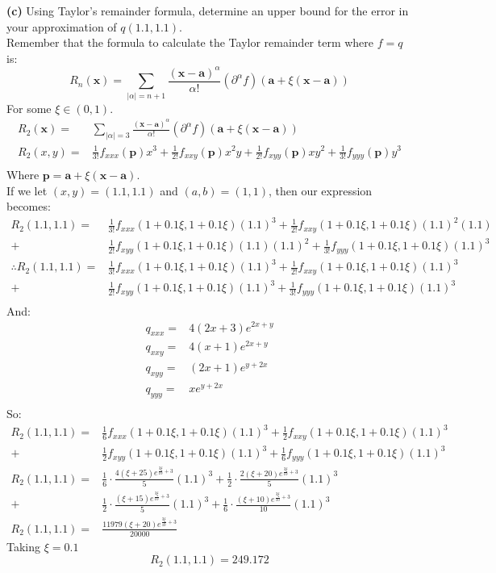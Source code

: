 \documentclass[12pt]{article}
\newcommand{\vect}[1]{\boldsymbol{#1}}
\begin{document}
\textbf{(c)} Using Taylor's remainder formula, determine an upper bound for the error in your approximation of $q(1.1, 1.1)$.\\
\medskip
Remember that the formula to calculate the Taylor remainder term where $f=q$ is:
\[
	R_n(\vect{x})=\sum_{|\alpha|=n+1}\frac{(\vect{x}-\vect{a})^\alpha}{\alpha!}(\partial^{\alpha}f)(\vect{a}+\xi(\vect{x}-\vect{a}))
\]
For some $\xi \in (0,1)$.\\
\begin{align*}
	R_2(\vect{x})=&\sum_{|\alpha|=3}\frac{(\vect{x}-\vect{a})^\alpha}{\alpha!}(\partial^{\alpha}f)(\vect{a}+\xi(\vect{x}-\vect{a})) \\
	R_2(x,y)=&\frac{1}{3!}f_{xxx}(\vect{p})x^3+\frac{1}{2!}f_{xxy}(\vect{p})x^2y+\frac{1}{2!}f_{xyy}(\vect{p})xy^2+\frac{1}{3!}f_{yyy}(\vect{p})y^3 \\
\end{align*}
Where $\vect{p}=\vect{a}+\xi(\vect{x}-\vect{a})$.\\
\smallskip
If we let $(x,y)=(1.1, 1.1)$ and $(a, b)=(1,1)$, then our expression becomes:\\
\begin{align*}
R_2(1.1,1.1)=&\frac{1}{3!}f_{xxx}(1+0.1\xi,1+0.1\xi)(1.1)^3+\frac{1}{2!}f_{xxy}(1+0.1\xi,1+0.1\xi)(1.1)^2(1.1)\\+&\frac{1}{2!}f_{xyy}(1+0.1\xi,1+0.1\xi)(1.1)(1.1)^2+\frac{1}{3!}f_{yyy}(1+0.1\xi,1+0.1\xi)(1.1)^3 \\
\therefore R_2(1.1,1.1)=&\frac{1}{3!}f_{xxx}(1+0.1\xi,1+0.1\xi)(1.1)^3+\frac{1}{2!}f_{xxy}(1+0.1\xi,1+0.1\xi)(1.1)^3\\+&\frac{1}{2!}f_{xyy}(1+0.1\xi,1+0.1\xi)(1.1)^3+\frac{1}{3!}f_{yyy}(1+0.1\xi,1+0.1\xi)(1.1)^3 \\
\end{align*}
And:\\
\begin{align*}
	q_{xxx}=&4(2x+3)e^{2x+y} \\
	q_{xxy}=&4(x+1)e^{2x+y} \\
	q_{xyy}=&(2x+1)e^{y+2x} \\
	q_{yyy}=&xe^{y+2x} \\
\end{align*}
So:
\begin{align*}
R_2(1.1,1.1)=&\frac{1}{6}f_{xxx}(1+0.1\xi,1+0.1\xi)(1.1)^3+\frac{1}{2}f_{xxy}(1+0.1\xi,1+0.1\xi)(1.1)^3\\+&\frac{1}{2}f_{xyy}(1+0.1\xi,1+0.1\xi)(1.1)^3+\frac{1}{6}f_{yyy}(1+0.1\xi,1+0.1\xi)(1.1)^3 \\
R_2(1.1,1.1)=&\frac{1}{6}\cdot \frac{4(\xi+25)e^{\frac{3\xi}{10}+3}}{5}(1.1)^3+\frac{1}{2}\cdot \frac{2(\xi+20)e^{\frac{3\xi}{10}+3}}{5}(1.1)^3\\+&\frac{1}{2}\cdot \frac{(\xi+15)e^{\frac{3\xi}{10}+3}}{5}(1.1)^3+\frac{1}{6}\cdot \frac{(\xi+10)e^{\frac{3\xi}{10}+3}}{10}(1.1)^3 \\
R_2(1.1,1.1)=&\frac{11979(\xi+20)e^{\frac{3\xi}{10}+3}}{20000}
\end{align*}
Taking $\xi=0.1$
\[
	R_2(1.1, 1.1)=249.172
\]
\end{document}
